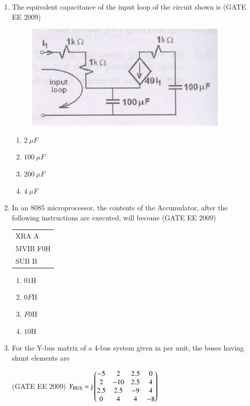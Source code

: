 \documentclass[journal,12pt,onecolumn]{IEEEtran}
\theoremstyle{remark}
\begin{document}
\begin{flushleft}
\begin{enumerate}
\item The equivalent capacitance of the input loop of the circuit shown is
\hfill(GATE EE 2009)
\begin{figure}[h!]
    \centering
    \includegraphics[width=0.5\columnwidth]{figs/Screenshot 2025-08-08 202455.png}
    \caption{}
    \label{fig:placeholder}
\end{figure}



\begin{enumerate}
    \item $2\ \mu F$
    \item $100\ \mu F$
    \item $200\ \mu F$
    \item $4\ \mu F$
\end{enumerate}

\item In an 8085 microprocessor, the contents of the Accumulator, after the following instructions are executed, will become
\hfill(GATE EE 2009)

\begin{tabular}{l}
XRA A \\
MVIB F0H \\
SUB B
\end{tabular}

\begin{enumerate}
    \item $01\text{H}$
    \item $0F\text{H}$
    \item $F0\text{H}$
    \item $10\text{H}$
\end{enumerate}


\item For the Y-bus matrix of a 4-bus system given in per unit, the buses having shunt elements are

\hfill(GATE EE 2009)
$Y_{\text{BUS}} = \mathrm{j}\begin{pmatrix}
-5 & 2 & 2.5 & 0 \\
2 & -10 & 2.5 & 4 \\
2.5 & 2.5 & -9 & 4 \\
0 & 4 & 4 & -8
\end{pmatrix}$



\end{enumerate}
\end{flushleft}
\end{document}
